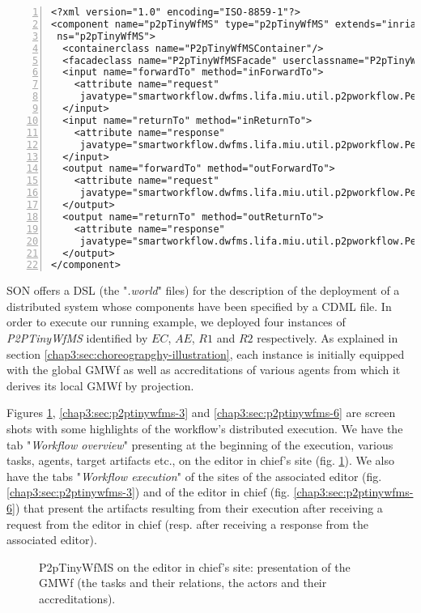 \begin{Verbatim}[frame=lines,fontsize=\scriptsize, numbers=left, numbersep=8pt, label=CDML file: specification of required and provided services of P2PTinyWfMS]
<?xml version="1.0" encoding="ISO-8859-1"?>
<component name="p2pTinyWfMS" type="p2pTinyWfMS" extends="inria.communicationprotocol"
 ns="p2pTinyWfMS">
  <containerclass name="P2pTinyWfMSContainer"/>
  <facadeclass name="P2pTinyWfMSFacade" userclassname="P2pTinyWfMS"/>
  <input name="forwardTo" method="inForwardTo">
    <attribute name="request" 
     javatype="smartworkflow.dwfms.lifa.miu.util.p2pworkflow.PeerToPeerWorkflowRequest"/>
  </input>
  <input name="returnTo" method="inReturnTo">
    <attribute name="response" 
     javatype="smartworkflow.dwfms.lifa.miu.util.p2pworkflow.PeerToPeerWorkflowResponse"/>
  </input>
  <output name="forwardTo" method="outForwardTo">
    <attribute name="request" 
     javatype="smartworkflow.dwfms.lifa.miu.util.p2pworkflow.PeerToPeerWorkflowRequest"/>
  </output>
  <output name="returnTo" method="outReturnTo">
    <attribute name="response" 
     javatype="smartworkflow.dwfms.lifa.miu.util.p2pworkflow.PeerToPeerWorkflowResponse"/>
  </output>
</component>
\end{Verbatim}


SON offers a DSL (the "\textit{.world}" files) for the description of the deployment of a distributed system whose components have been specified by a CDML file. In order to execute our running example, we deployed four instances of \textit{P2PTinyWfMS} identified by $EC$, $AE$, $R1$ and $R2$ respectively. As explained in section \ref{chap3:sec:choreograpghy-illustration}, each instance is initially equipped with the global GMWf as well as accreditations of various agents from which it derives its local GMWf by projection.

Figures \ref{chap3:sec:p2ptinywfms-1}, \ref{chap3:sec:p2ptinywfms-3} and \ref{chap3:sec:p2ptinywfms-6} are screen shots with some highlights of the workflow's distributed execution.
We have the tab "\textit{Workflow overview}" presenting at the beginning of the execution, various tasks, agents, target artifacts etc., on the editor in chief's site (fig. \ref{chap3:sec:p2ptinywfms-1}). We also have the tabs "\textit{Workflow execution}" of the sites of the associated editor (fig. \ref{chap3:sec:p2ptinywfms-3}) and of the editor in chief (fig. \ref{chap3:sec:p2ptinywfms-6}) that present the artifacts resulting from their execution after receiving a request from the editor in chief (resp. after receiving a response from the associated editor).
\begin{figure}[ht!]
	\noindent
	\caption{P2pTinyWfMS on the editor in chief's site: presentation of the GMWf (the tasks and their relations, the actors and their accreditations).}
	\label{chap3:sec:p2ptinywfms-1}
\end{figure}

